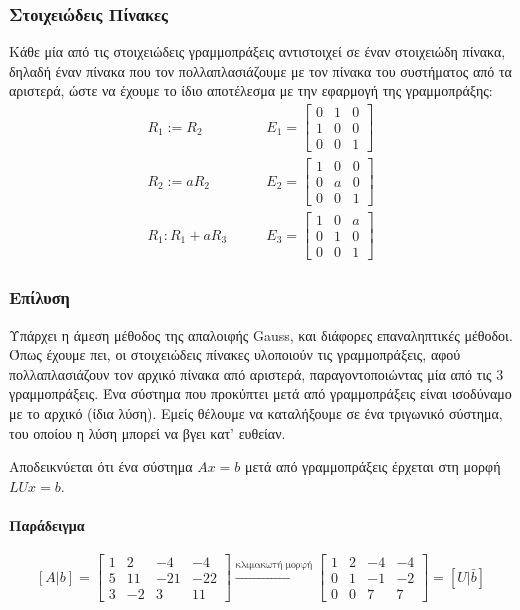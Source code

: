 \documentclass[11pt,a4paper,notitlepage,fleqn]{article}
\begin{document}
\begin{itemize}
	\subsubsection{Στοιχειώδεις Πίνακες}
	Κάθε μία από τις στοιχειώδεις γραμμοπράξεις αντιστοιχεί σε έναν
	στοιχειώδη πίνακα, δηλαδή έναν πίνακα που τον πολλαπλασιάζουμε με
	τον πίνακα του συστήματος από τα αριστερά, ώστε να έχουμε το ίδιο
	αποτέλεσμα με την εφαρμογή της γραμμοπράξης:
	\begin{align*}
		R_1 := R_2 &\qquad E_1 = \left[\begin{matrix}
		0&1&0\\1&0&0\\0&0&1
		\end{matrix}\right] \\
		R_2 := aR_2 &\qquad E_2 = \left[\begin{matrix}
		1&0&0\\0&a&0\\0&0&1
		\end{matrix}\right] \\
		R_1 : R_1+aR_3 &\qquad E_3=\left[\begin{matrix}
		1&0&a\\0&1&0\\0&0&1
		\end{matrix}\right]
	\end{align*}
\end{itemize}

\subsubsection{Επίλυση}
Υπάρχει η άμεση μέθοδος της απαλοιφής Gauss, και διάφορες επαναληπτικές
μέθοδοι. Όπως έχουμε πει, οι στοιχειώδεις πίνακες υλοποιούν τις
γραμμοπράξεις, αφού πολλαπλασιάζουν τον αρχικό πίνακα από αριστερά,
παραγοντοποιώντας μία από τις 3 γραμμοπράξεις. Ένα σύστημα που προκύπτει
μετά από γραμμοπράξεις είναι ισοδύναμο με το αρχικό (ίδια λύση). Εμείς
θέλουμε να καταλήξουμε σε ένα τριγωνικό σύστημα, του οποίου η λύση
μπορεί να βγει κατ' ευθείαν.

Αποδεικνύεται ότι ένα σύστημα \( Ax=b \) μετά από γραμμοπράξεις
έρχεται στη μορφή \( LUx = b \).

\paragraph{Παράδειγμα}
\[
[A|b] = \left[\begin{array}{ccc|c}
1&2&-4&-4\\5&11&-21&-22\\3&-2&3&11
\end{array}\right]
\xrightarrow{\text{κλιμακωτή μορφή}}
\left[\begin{matrix}
1&2&-4&-4\\0&1&-1&-2\\0&0&7&7
\end{matrix}\right] = [U|\bar b]
\]
\end{document}
